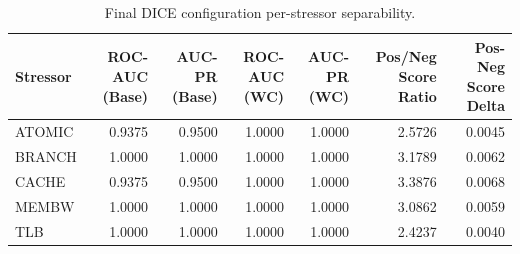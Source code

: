 \begin{table}[t]
\centering
\caption{Final DICE configuration per-stressor separability.}
\label{tab:dice_full_stressor}
\footnotesize
\begin{tabular}{lrrrrrr}
\toprule
Stressor & ROC-AUC (Base) & AUC-PR (Base) & ROC-AUC (WC) & AUC-PR (WC) & Pos/Neg Score Ratio & Pos-Neg Score Delta \\
\midrule
ATOMIC & 0.9375 & 0.9500 & 1.0000 & 1.0000 & 2.5726 & 0.0045 \\
BRANCH & 1.0000 & 1.0000 & 1.0000 & 1.0000 & 3.1789 & 0.0062 \\
CACHE & 0.9375 & 0.9500 & 1.0000 & 1.0000 & 3.3876 & 0.0068 \\
MEMBW & 1.0000 & 1.0000 & 1.0000 & 1.0000 & 3.0862 & 0.0059 \\
TLB & 1.0000 & 1.0000 & 1.0000 & 1.0000 & 2.4237 & 0.0040 \\
\bottomrule
\end{tabular}

\end{table}
